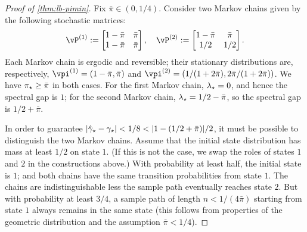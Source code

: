 
\begin{proof}[Proof of \cref{thm:lb-pimin}]
  Fix $\bar\pi \in (0,1/4)$.
  Consider two Markov chains given by the following stochastic
  matrices:
  \[
    \vP^{(1)} :=
    \begin{bmatrix}
      1-\bar\pi & \bar\pi \\
      1-\bar\pi & \bar\pi
    \end{bmatrix}
    , \quad
    \vP^{(2)} :=
    \begin{bmatrix}
      1-\bar\pi & \bar\pi \\
      1/2 & 1/2
    \end{bmatrix}
    .
  \]
  Each Markov chain is ergodic and reversible; their stationary
  distributions are, respectively, $\vpi^{(1)} = (1-\bar\pi,\bar\pi)$
  and $\vpi^{(2)} = (1/(1+2\bar\pi),2\bar\pi/(1+2\bar\pi))$.
  We have $\pi_{\star} \geq \bar\pi$ in both cases.
  For the first Markov chain, $\lambda_{\star} = 0$, and hence the spectral gap
  is $1$; for the second Markov chain, $\lambda_{\star} = 1/2-\bar\pi$, so the
  spectral gap is $1/2+\bar\pi$.

  In order to guarantee $|\hat\gamma_{\star} - \gamma_{\star}| < 1/8 < |1 -
  (1/2+\bar\pi)|/2$, it must be possible to distinguish the two Markov
  chains.
  Assume that the initial state distribution has mass at least $1/2$
  on state $1$.
  (If this is not the case, we swap the roles of states $1$ and $2$ in
  the constructions above.)
  With probability at least half, the initial state is $1$; and both
  chains have the same transition probabilities from state $1$.
  The chains are indistinguishable less the sample path eventually
  reaches state $2$.
  But with probability at least $3/4$, a sample path of length $n <
  1/(4\bar\pi)$ starting from state $1$ always remains in the same
  state (this follows from properties of the geometric distribution
  and the assumption $\bar\pi < 1/4$).
\end{proof}


